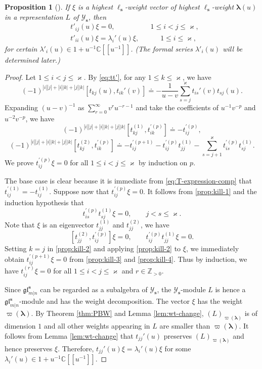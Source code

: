 \documentclass[11pt,reqno]{amsart}
\numberwithin{equation}{section}
\newtheorem{prop}[thm]{Proposition}
\theoremstyle{definition}
\theoremstyle{remark}
\newcommand{\beq}{\begin{equation}}
\newcommand{\eeq}{\end{equation}}
\newcommand{\C}{\mathbb{C}}
\newcommand{\Z}{\mathbb{Z}}
\newcommand{\lle}{\leqslant}
\newcommand{\la}{\lambda}
\newcommand{\bla}{\bm\lambda}
\newcommand{\glMN}{\mathfrak{gl}_{m|n}^{\bm s}}
\newcommand{\YMN}{{\mathscr{Y}_{\bm s}}}
\newcommand{\ka}{\varkappa}
\newcommand{\s}{{\bm s}}
\begin{document}
\begin{prop}[\cite{Ragoucy2007analytical,Belliard2009nested}]\label{prop:t'-l-weight}
If $\xi$ is a highest $\ell_\s$-weight vector of highest $\ell_\s$-weight $\bla(u)$ in a representation $L$ of $\YMN$, then
\beq\label{eq:t'-annih}
\begin{split}
   & t'_{ij}(u)\xi=0,  \qquad \quad\quad \quad 1\lle i<j\lle \ka,\\
   & t'_{ii}(u)\xi=\la_i'(u)\xi,\qquad\quad  1\lle i\lle \ka,
\end{split}
\eeq
for certain $\la'_i(u)\in 1+u^{-1}\C[[u^{-1}]]$. (The formal series $\la'_i(u)$ will be determined later.)
\end{prop}
\begin{proof}
Let $1\lle i<j\lle \ka$. By \eqref{eq:tt'}, for any $1\lle k\lle \ka$, we have
\[
(-1)^{|i||j|+|i||k|+|j||k|}[t_{kj}(u),t_{ik}'(v)]\doteq -\frac{1}{u-v}\sum_{s=j}^{\ka}t_{is}'(v)t_{sj}(u).
\]
Expanding $(u-v)^{-1}$ as $\sum_{r=0}^\infty v^ru^{-r-1}$ and take the coefficients of $u^{-1}v^{-p}$ and $u^{-2}v^{-p}$, we have
\beq\label{prop:kill-1}
(-1)^{|i||j|+|i||k|+|j||k|}[t_{kj}^{(1)},t_{ik}^{\prime (p)}]\doteq -t_{ij}^{\prime (p)},
\eeq
\beq\label{prop:kill-2}
(-1)^{|i||j|+|i||k|+|j||k|}[t_{kj}^{(2)},t_{ik}^{\prime (p)}]\doteq -t_{ij}^{\prime (p+1)}-t_{ij}^{\prime (p)}t_{jj}^{(1)}-\sum_{s=j+1}^\ka t_{is}^{\prime (p)}t_{sj}^{(1)}.
\eeq
We prove $t_{ij}^{\prime(p)}\xi=0$ for all $1\lle i<j\lle \ka$ by induction on $p$.

The base case is clear because it is immediate from \eqref{eq:T-expression-comp} that $t_{ij}^{\prime(1)}=-t_{ij}^{(1)}$. Suppose now that $t_{ij}^{\prime(p)}\xi=0$. It follows from \eqref{prop:kill-1} and the induction hypothesis that
\beq\label{prop:kill-3}
t_{is}^{\prime (p)}t_{sj}^{(1)}\xi=0,\qquad j<s\lle \ka.
\eeq
Note that $\xi$ is an eigenvector $t_{jj}^{(1)}$ and $t_{jj}^{(2)}$, we have
\beq\label{prop:kill-4}
[t_{jj}^{(2)},t_{ij}^{\prime(p)}]\xi=0,\qquad  t_{ij}^{\prime (p)}t_{jj}^{(1)}\xi=0.
\eeq
Setting $k=j$ in \eqref{prop:kill-2} and applying \eqref{prop:kill-2} to $\xi$, we immediately obtain $t_{ij}^{\prime(p+1)}\xi=0$ from \eqref{prop:kill-3} and \eqref{prop:kill-4}. Thus by induction, we have $t_{ij}^{(r)}\xi=0$ for all $1\lle i<j\lle \ka$ and $r\in \Z_{>0}$.

Since $\glMN$ can be regarded as a subalgebra of $\YMN$, the $\YMN$-module $L$ is hence a $\glMN$-module and has the weight decomposition. The vector $\xi$ has the weight $\varpi(\bla)$. By Theorem \ref{thm:PBW} and Lemma \ref{lem:wt-change}, $(L)_{\varpi(\bla)}$ is of dimension $1$ and all other weights appearing in $L$ are smaller than $\varpi(\bla)$. It follows from Lemma \ref{lem:wt-change} that $t_{jj}'(u)$ preserves $(L)_{\varpi(\bla)}$ and hence preserves $\xi$. Therefore, $t_{jj}'(u)\xi=\la_i'(u)\xi$ for some $\la_i'(u)\in 1+u^{-1}\C[[u^{-1}]]$.
\end{proof}
\end{document}
